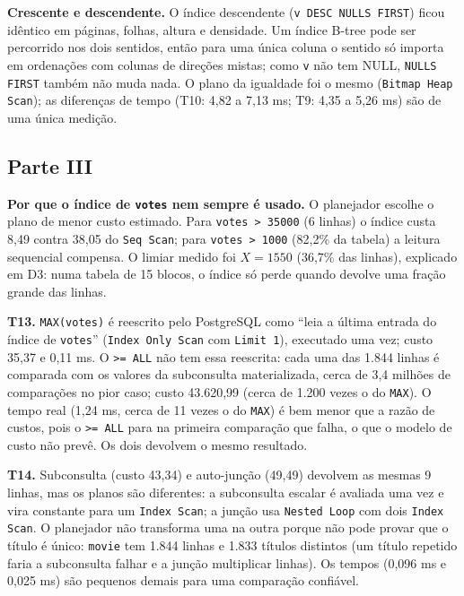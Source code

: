 \documentclass[11pt,a4paper]{article}
\newcommand{\tp}[1]{\texttt{#1}}
\begin{document}
\textbf{Crescente e descendente.} O índice descendente (\tp{v DESC NULLS FIRST}) ficou idêntico em páginas, folhas, altura e densidade. Um índice B-tree pode ser percorrido nos dois sentidos, então para uma única coluna o sentido só importa em ordenações com colunas de direções mistas; como \tp{v} não tem NULL, \tp{NULLS FIRST} também não muda nada. O plano da igualdade foi o mesmo (\tp{Bitmap Heap Scan}); as diferenças de tempo (T10: 4,82 a 7,13 ms; T9: 4,35 a 5,26 ms) são de uma única medição.

\subsection*{Parte III}
\textbf{Por que o índice de \tp{votes} nem sempre é usado.} O planejador escolhe o plano de menor custo estimado. Para \tp{votes > 35000} (6 linhas) o índice custa 8,49 contra 38,05 do \tp{Seq Scan}; para \tp{votes > 1000} (82,2\% da tabela) a leitura sequencial compensa. O limiar medido foi $X = 1550$ (36,7\% das linhas), explicado em D3: numa tabela de 15 blocos, o índice só perde quando devolve uma fração grande das linhas.

\textbf{T13.} \tp{MAX(votes)} é reescrito pelo PostgreSQL como ``leia a última entrada do índice de \tp{votes}'' (\tp{Index Only Scan} com \tp{Limit 1}), executado uma vez; custo 35,37 e 0,11 ms. O \tp{>= ALL} não tem essa reescrita: cada uma das 1.844 linhas é comparada com os valores da subconsulta materializada, cerca de 3,4 milhões de comparações no pior caso; custo 43.620,99 (cerca de 1.200 vezes o do \tp{MAX}). O tempo real (1,24 ms, cerca de 11 vezes o do \tp{MAX}) é bem menor que a razão de custos, pois o \tp{>= ALL} para na primeira comparação que falha, o que o modelo de custo não prevê. Os dois devolvem o mesmo resultado.

\textbf{T14.} Subconsulta (custo 43,34) e auto-junção (49,49) devolvem as mesmas 9 linhas, mas os planos são diferentes: a subconsulta escalar é avaliada uma vez e vira constante para um \tp{Index Scan}; a junção usa \tp{Nested Loop} com dois \tp{Index Scan}. O planejador não transforma uma na outra porque não pode provar que o título é único: \tp{movie} tem 1.844 linhas e 1.833 títulos distintos (um título repetido faria a subconsulta falhar e a junção multiplicar linhas). Os tempos (0,096 ms e 0,025 ms) são pequenos demais para uma comparação confiável.
\end{document}
